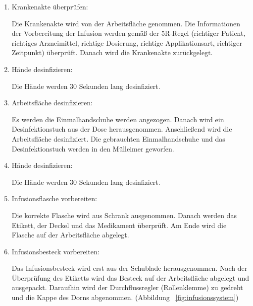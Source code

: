   \begin{enumerate}[start=0]
      \item Krankenakte überprüfen:
      
      Die Krankenakte wird von der Arbeitsfläche genommen. Die Informationen der Vorbereitung der Infusion werden gemäß der 5R-Regel (richtiger Patient, richtiges Arzneimittel, richtige Dosierung, richtige Applikationsart, richtiger Zeitpunkt) überprüft. Danach wird die Krankenakte zurückgelegt.
      
      \item Hände desinfizieren:
      
      Die Hände werden 30 Sekunden lang desinfiziert.
      
      \item Arbeitsfläche desinfizieren:
      
      Es werden die Einmalhandschuhe werden angezogen. Danach wird ein Desinfektionstuch aus der Dose herausgenommen. Anschließend wird die Arbeitsfläche desinfiziert. Die gebrauchten Einmalhandschuhe und das Desinfektionstuch werden in den Mülleimer geworfen.
      
      \item Hände desinfizieren:
      
      Die Hände werden 30 Sekunden lang desinfiziert.
      
      \item Infusionsflasche vorbereiten:
      
      Die korrekte Flasche wird aus Schrank ausgenommen. Danach werden das Etikett, der Deckel und das Medikament überprüft. Am Ende wird die Flasche auf der Arbeitsfläche abgelegt.
      
      \item Infusionsbesteck vorbereiten:
      
      Das Infusionsbesteck wird erst aus der Schublade herausgenommen. Nach der Überprüfung des Etiketts wird das Besteck auf der Arbeitsfläche abgelegt und ausgepackt. Daraufhin wird der Durchflussregler (Rollenklemme) zu gedreht und die Kappe des Dorns abgenommen. (Abbildung ~\ref{fig:infusionssystem})
      

\end{enumerate}
